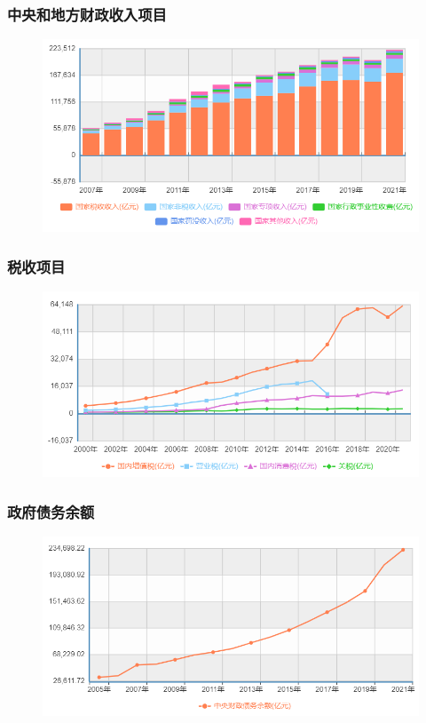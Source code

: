 \documentclass[aspectratio=169, 12pt]{beamer}
\begin{document}
\begin{frame}[plain]
    \frametitle{中央和地方财政收入项目}
    \begin{figure}
        \centering
        \includegraphics[width=1.0\textwidth]{./resources/figure/incomeratio.png}
    \end{figure}
\end{frame}

\begin{frame}[plain]
    \frametitle{税收项目}
    \begin{figure}
        \centering
        \includegraphics[width=1.0\textwidth]{./resources/figure/tax.png}
    \end{figure}
\end{frame}

\begin{frame}[plain]
    \frametitle{政府债务余额}
    \begin{figure}
        \centering
        \includegraphics[width=1.0\textwidth]{./resources/figure/debt.png}
    \end{figure}
\end{frame}
\end{document}
